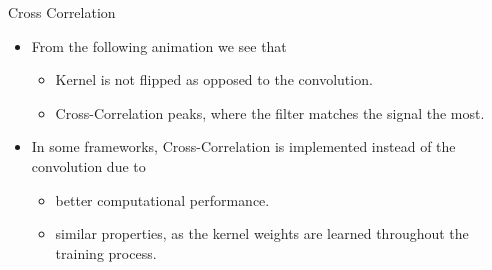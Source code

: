\begin{vbframe}{Cross Correlation}
    \begin{itemize}
        \item From the following animation we see that
        \begin{itemize}
            \item Kernel is not flipped as opposed to the convolution.
            \item Cross-Correlation peaks, where the filter matches the signal the most.    
        \end{itemize}
        \item In some frameworks, Cross-Correlation is implemented instead of the convolution due to
        \begin{itemize}
            \item better computational performance.
            \item similar properties, as the kernel weights are learned throughout the training process.
        \end{itemize}
    \end{itemize}
\end{vbframe}
 
